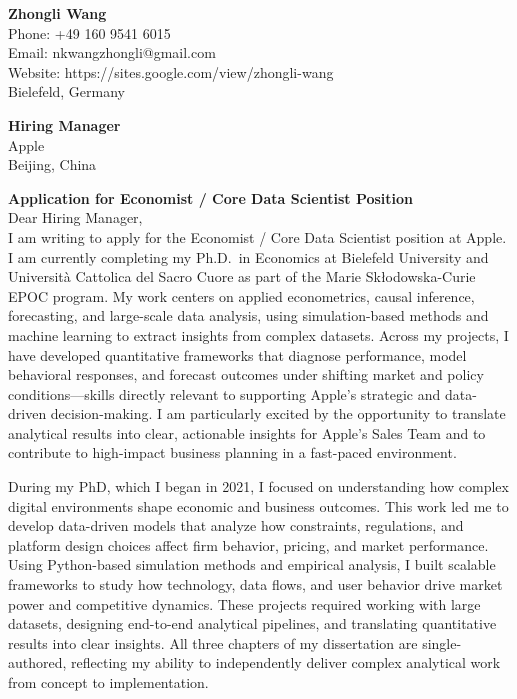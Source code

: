 \documentclass[11pt]{article}
\begin{document}
\noindent
\textbf{Zhongli Wang} \\
Phone: +49 160 9541 6015 \\
Email: nkwangzhongli@gmail.com \\
Website: https://sites.google.com/view/zhongli-wang \\
Bielefeld, Germany \\

\vspace{0.5cm}

\noindent
\textbf{Hiring Manager} \\
Apple \\
Beijing, China \\

\vspace{0.5cm}

\noindent
\textbf{Application for Economist / Core Data Scientist Position} \\

\noindent Dear Hiring Manager,\\[0.2cm]

I am writing to apply for the Economist / Core Data Scientist position at Apple. 
I am currently completing my Ph.D.\ in Economics at Bielefeld University and Università Cattolica del Sacro Cuore as part of the Marie Skłodowska-Curie EPOC program. 
My work centers on applied econometrics, causal inference, forecasting, and large-scale data analysis, using simulation-based methods and machine learning to extract insights from complex datasets. 
Across my projects, I have developed quantitative frameworks that diagnose performance, model behavioral responses, and forecast outcomes under shifting market and policy conditions—skills directly relevant to supporting Apple’s strategic and data-driven decision-making. 
I am particularly excited by the opportunity to translate analytical results into clear, actionable insights for Apple’s Sales Team and to contribute to high-impact business planning in a fast-paced environment.

During my PhD, which I began in 2021, I focused on understanding how complex digital environments shape economic and business outcomes. 
This work led me to develop data-driven models that analyze how constraints, regulations, and platform design choices affect firm behavior, pricing, and market performance. 
Using Python-based simulation methods and empirical analysis, I built scalable frameworks to study how technology, data flows, and user behavior drive market power and competitive dynamics. 
These projects required working with large datasets, designing end-to-end analytical pipelines, and translating quantitative results into clear insights. 
All three chapters of my dissertation are single-authored, reflecting my ability to independently deliver complex analytical work from concept to implementation.
\end{document}
